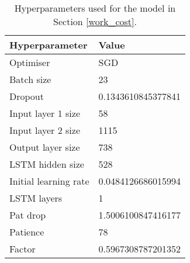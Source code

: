 \begin{table}[h]
	\centering
	\begin{tabular}{l | l}
		Hyperparameter & Value \\
		\hline
		Optimiser & SGD \\
		Batch size & 23 \\
		Dropout & 0.1343610845377841 \\
		Input layer 1 size & 58 \\
		Input layer 2 size & 1115 \\
		Output layer size & 738 \\
		LSTM hidden size & 528 \\
		Initial learning rate & 0.0484126686015994 \\
		LSTM layers & 1 \\
		Pat drop & 1.5006100847416177 \\
		Patience & 78 \\
		Factor & 0.5967308787201352
	\end{tabular}
	\caption{Hyperparameters used for the model in Section \ref{work_cost}.}
	\label{hyperparams_work_cost}
\end{table}